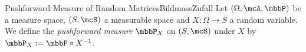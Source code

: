 \begin{mdef}{Pushforward Measure of Random Matrices}{BildmassZufall}
    Let $(\Omega,\mcA,\mbbP)$ be a measure space, $(S,\mcS)$ a measurable space and $X:\Omega\to S$ a random variable. We define the \emph{pushforward measure} $\mbbP_X$ on $(S,\mcS)$ under $X$ by $\mbbP_X := \mbbP\circ X^{-1}$.
\end{mdef}